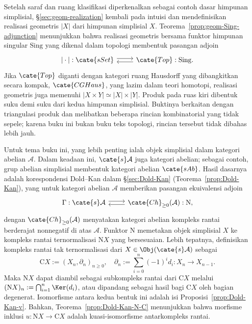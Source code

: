 Setelah saraf dan ruang klasifikasi diperkenalkan sebagai contoh dasar
himpunan simplisial, \S\ref{sec:geom-realization} kembali pada intuisi dan
mendefinisikan realisasi geometris $|X|$ dari himpunan simplisial $X$.
Teorema~\ref{prop:geom-Sing-adjunction} menunjukkan bahwa realisasi geometris
bersama funktor himpunan singular $\mathrm{Sing}$ yang dikenal dalam topologi
membentuk pasangan adjoin
\[\begin{tikzcd}
	{|\cdot|}: \cate{sSet} \arrow[shift left, r] & \cate{Top} : \mathrm{Sing}. \arrow[shift left, l]
\end{tikzcd}\]
Jika $\cate{Top}$ diganti dengan kategori ruang Hausdorff yang dibangkitkan
secara kompak, $\cate{CGHaus}$, yang lazim dalam teori homotopi, realisasi
geometris juga memenuhi $|X\times Y|\simeq|X|\times|Y|$. Produk pada ruas
kiri dibentuk suku demi suku dari kedua himpunan simplisial. Buktinya berkaitan
dengan triangulasi produk dan melibatkan beberapa rincian kombinatorial yang
tidak sepele; karena buku ini bukan buku teks topologi, rincian tersebut tidak
dibahas lebih jauh.

Untuk tema buku ini, yang lebih penting ialah objek simplisial dalam kategori
abelian $\mathcal{A}$. Dalam keadaan ini, $\cate{s}\mathcal{A}$ juga kategori
abelian; sebagai contoh, grup abelian simplisial membentuk kategori abelian
$\cate{sAb}$. Hasil dasarnya adalah korespondensi Dold--Kan dalam
\S\ref{sec:Dold-Kan} (Teorema~\ref{prop:Dold-Kan}), yang untuk kategori abelian
$\mathcal{A}$ memberikan pasangan ekuivalensi adjoin
\[\begin{tikzcd}
	\Gamma: \cate{s}\mathcal{A} \arrow[shift left, r] & \cate{Ch}_{\geq 0}(\mathcal{A}): \mathrm{N}, \arrow[shift left, l]
\end{tikzcd}\]
dengan $\cate{Ch}_{\geq0}(\mathcal{A})$ menyatakan kategori abelian kompleks rantai
berderajat nonnegatif di atas $\mathcal{A}$. Funktor $\mathrm{N}$ memetakan
objek simplisial $X$ ke kompleks rantai ternormalisasi $\mathrm{N}X$ yang
bersesuaian. Lebih tepatnya, definisikan kompleks rantai tak ternormalisasi
dari $X\in\Obj(\cate{s}\mathcal{A})$ sebagai
\[ \mathrm{C}X := \left( X_n, \partial_n\right)_{n \geq 0}, \quad \partial_n := \sum_{i=0}^n (-1)^i d_i : X_n \to X_{n-1}. \]
Maka $\mathrm{N}X$ dapat diambil sebagai subkompleks rantai dari
$\mathrm{C}X$ melalui
$(\mathrm{N}X)_n:=\bigcap_{i=1}^n\Ker(d_i)$, atau dipandang sebagai hasil
bagi $\mathrm{C}X$ oleh bagian degenerat. Isomorfisme antara kedua bentuk ini
adalah isi Proposisi~\ref{prop:Dold-Kan-v}. Bahkan,
Teorema~\ref{prop:Dold-Kan-N-C} menunjukkan bahwa morfisme inklusi
$u:\mathrm{N}X\to\mathrm{C}X$ adalah kuasi-isomorfisme antarkompleks rantai.

